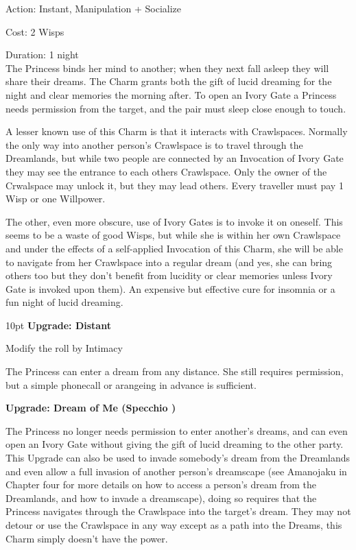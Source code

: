 \noindent Action: Instant, Manipulation + Socialize

\noindent Cost: 2 Wisps

\noindent Duration: 1 night \\

\noindent The Princess binds her mind to another; when they next fall asleep they will share their dreams. The Charm grants both the gift of lucid dreaming for the night and clear memories the morning after. To open an Ivory Gate a Princess needs permission from the target, and the pair must sleep close enough to touch.

A lesser known use of this Charm is that it interacts with Crawlspaces. Normally the only way into another person's Crawlspace is to travel through the Dreamlands, but while two people are connected by an Invocation of Ivory Gate they may see the entrance to each others Crawlspace. Only the owner of the Crwalspace may unlock it, but they may lead others. Every traveller must pay 1 Wisp or one Willpower.  

The other, even more obscure, use of Ivory Gates is to invoke it on oneself. This seems to be a waste of good Wisps, but while she is within her own Crawlspace and under the effects of a self-applied Invocation of this Charm, she will be able to navigate from her Crawlspace into a regular dream (and yes, she can bring others too but they don't benefit from lucidity or clear memories unless Ivory Gate is invoked upon them). An expensive but effective cure for insomnia or a fun night of lucid dreaming. 

\begin{myindentpar}{10pt} \textbf{Upgrade: Distant}

\noindent Modify the roll by Intimacy

The Princess can enter a dream from any distance. She still requires permission, but a simple phonecall or arangeing in advance is sufficient. 

\textbf{Upgrade: Dream of Me (Specchio \textbullet\textbullet)}

The Princess no longer needs permission to enter another's dreams, and can even open an Ivory Gate without giving the gift of lucid dreaming to the other party. This Upgrade can also be used to invade somebody's dream from the Dreamlands and even allow a full invasion of another person's dreamscape (see Amanojaku in Chapter four for more details on how to access a person's dream from the Dreamlands, and how to invade a dreamscape), doing so requires that the Princess navigates through the Crawlspace into the target's dream. They may not detour or use the Crawlspace in any way except as a path into the Dreams, this Charm simply doesn’t have the power. 

\end{myindentpar}

